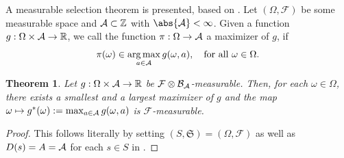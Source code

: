 \documentclass[
    a4paper,
    11pt,
    bibliography=totoc,
    listof=totoc,      
    headinclude=true,
    cleardoublepage=empty,
]{scrbook}
\newcommand{\printbibliography}{%
}
\theoremstyle{plain}
\newtheorem{theorem}{Theorem}[chapter]
\theoremstyle{definition}
\theoremstyle{remark}
\newcommand{\SetR}{\mathbb R}
\newcommand{\SpaceA}{{\cal A}}
\DeclareMathOperator*{\argmax}{arg\,max}
\begin{document}
A measurable selection theorem is presented, based on \cite[Lemma~16.1.15]{hinderer2016_do}. Let $(\Omega,\mathcal{F})$ be some measurable space and 
$\SpaceA \subset \mathbb{Z}$ with $\abs{\SpaceA}<\infty$. Given a function 
$g:\Omega \times \SpaceA \to\SetR$, we call the function $\pi:\Omega \to
\SpaceA$ a maximizer of $g$, if
\[
    \pi(\omega) \in \argmax_{a\in\SpaceA} g(\omega,a),
    \quad \text{for all } \omega\in\Omega.
\]

\begin{theorem}
\label{thm:SelectionTheorem}
    Let $g:\Omega\times\SpaceA\to\SetR$ be $\mathcal{F} \otimes
    \mathcal{B}_{\SpaceA}$-measurable. Then, for each $\omega\in\Omega$, there
    exists a smallest and a largest maximizer of $g$ and the map $\omega\mapsto
    g^*(\omega) := \max_{a\in\SpaceA} g(\omega,a)$ is $\mathcal{F}$-measurable.
\end{theorem}
\begin{proof}
    This follows literally by setting $(S,\mathfrak{S})=(\Omega,\mathcal{F})$ as
    well as $D(s)=A=\SpaceA$ for each $s\in S$ in 
    \cite[Lemma~16.1.15]{hinderer2016_do}.
\end{proof}




\listoffigures

\listoftables

\printbibliography


\end{document}
